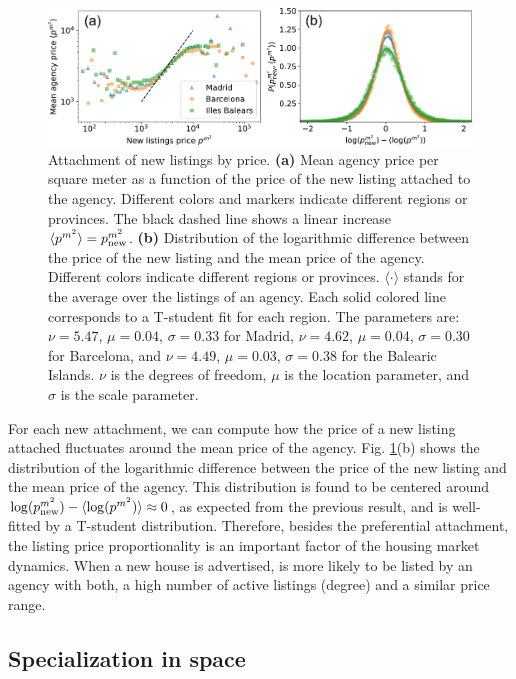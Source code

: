 \begin{figure}
    \centering
    \includegraphics[width =\textwidth]{Figs/Idealista_dynamics/panel_attach_price.pdf}
	\caption[Attachment dynamics of new listings by price.]{Attachment of new listings by price. \textbf{(a)} Mean agency price per square meter as a function of the price of the new listing attached to the agency. Different colors and markers indicate different regions or provinces. The black dashed line shows a linear increase $\langle p^{{m}^2} \rangle = p^{{m}^2}_{\rm new}$. \textbf{(b)} Distribution of the logarithmic difference between the price of the new listing and the mean price of the agency. Different colors indicate different regions or provinces. $\langle \cdot \rangle$ stands for the average over the listings of an agency. Each solid colored line corresponds to a T-student fit for each region. The parameters are: $\nu = 5.47$, $\mu = 0.04$, $\sigma = 0.33$ for Madrid, $\nu = 4.62$, $\mu = 0.04$, $\sigma = 0.30$ for Barcelona, and $\nu = 4.49$, $\mu = 0.03$, $\sigma = 0.38$ for the Balearic Islands. $\nu$ is the degrees of freedom, $\mu$ is the location parameter, and $\sigma$ is the scale parameter. \label{fig:attach_price}}
\end{figure}

For each new attachment, we can compute how the price of a new listing attached fluctuates around the mean price of the agency. Fig. \ref{fig:attach_price}(b) shows the distribution of the logarithmic difference between the price of the new listing and the mean price of the agency. This distribution is found to be centered around $\log( p^{{m}^2}_{\rm new}) - \langle \log ( p^{{m}^2} ) \rangle \approx 0$, as expected from the previous result, and is well-fitted by a T-student distribution. Therefore, besides the preferential attachment, the listing price proportionality is an important factor of the housing market dynamics. When a new house is advertised, is more likely to be listed by an agency with both, a high number of  active listings (degree) and a similar price range.

\subsection{Specialization in space}

